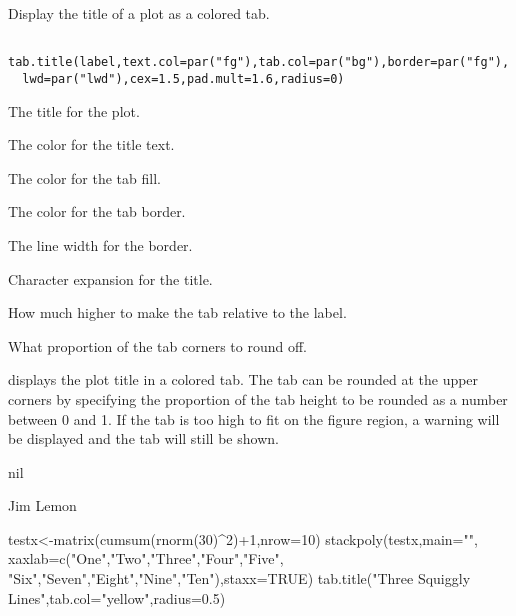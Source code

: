 \begin{Description}\relax
Display the title of a plot as a colored tab.
\end{Description}
\begin{Usage}
\begin{verbatim}
 tab.title(label,text.col=par("fg"),tab.col=par("bg"),border=par("fg"),
  lwd=par("lwd"),cex=1.5,pad.mult=1.6,radius=0)
\end{verbatim}
\end{Usage}
\begin{Arguments}
\begin{ldescription}
\item[\code{label}] The title for the plot.
\item[\code{text.col}] The color for the title text.
\item[\code{tab.col}] The color for the tab fill.
\item[\code{border}] The color for the tab border.
\item[\code{lwd}] The line width for the border.
\item[\code{cex}] Character expansion for the title.
\item[\code{pad.mult}] How much higher to make the tab relative to the label.
\item[\code{radius}] What proportion of the tab corners to round off.
\end{ldescription}
\end{Arguments}
\begin{Details}\relax
{} displays the plot title in a colored tab. The tab can be
rounded at the upper corners by specifying the proportion of the tab
height to be rounded as a number between 0 and 1. If the tab is too high
to fit on the figure region, a warning will be displayed and the tab will
still be shown.
\end{Details}
\begin{Value}
nil
\end{Value}
\begin{Author}\relax
Jim Lemon
\end{Author}
\begin{SeeAlso}\relax
{}
\end{SeeAlso}
\begin{Examples}
\begin{ExampleCode}
 testx<-matrix(cumsum(rnorm(30)^2)+1,nrow=10)
 stackpoly(testx,main="",
  xaxlab=c("One","Two","Three","Four","Five",
  "Six","Seven","Eight","Nine","Ten"),staxx=TRUE)
 tab.title("Three Squiggly Lines",tab.col="yellow",radius=0.5)
\end{ExampleCode}
\end{Examples}

